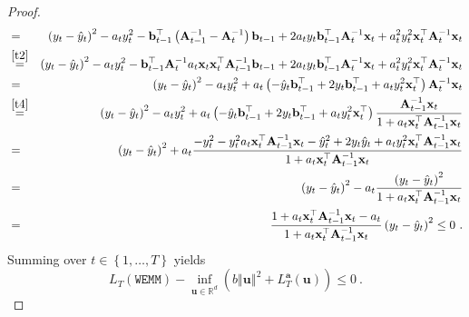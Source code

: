 \begin{proof}
\begin{eqnarray*}
 & = & \left(y_{t}-\hat{y}_{t}\right)^{2}-a_{t}y_{t}^{2}-\mathbf{b}_{t-1}^{\top}\left(\mathbf{A}_{t-1}^{-1}-\mathbf{A}_{t}^{-1}\right)\mathbf{b}_{t-1}+2a_{t}y_{t}\mathbf{b}_{t-1}^{\top}\mathbf{A}_{t}^{-1}\mathbf{x}_{t}+a_{t}^{2}y_{t}^{2}\mathbf{x}_{t}^{\top}\mathbf{A}_{t}^{-1}\mathbf{x}_{t}\\
 & \overset{\eqref{t2}}{=}  &\left(y_{t}-\hat{y}_{t}\right)^{2}-a_{t}y_{t}^{2}-\mathbf{b}_{t-1}^{\top}\mathbf{A}_{t}^{-1}a_{t}\mathbf{x}_{t}\mathbf{x}_{t}^{\top}\mathbf{A}_{t-1}^{-1}\mathbf{b}_{t-1}+2a_{t}y_{t}\mathbf{b}_{t-1}^{\top}\mathbf{A}_{t}^{-1}\mathbf{x}_{t}+a_{t}^{2}y_{t}^{2}\mathbf{x}_{t}^{\top}\mathbf{A}_{t}^{-1}\mathbf{x}_{t}\\
&=  & \left(y_{t}-\hat{y}_{t}\right)^{2}-a_{t}y_{t}^{2}+a_{t}\left(-\hat{y}_{t}\mathbf{b}_{t-1}^{\top}+2y_{t}\mathbf{b}_{t-1}^{\top}+a_{t}y_{t}^{2}\mathbf{x}_{t}^{\top}\right)\mathbf{A}_{t}^{-1}\mathbf{x}_{t}\\
 &\overset{\eqref{t4}}{=}  & \left(y_{t}-\hat{y}_{t}\right)^{2}-a_{t}y_{t}^{2}+a_{t}\left(-\hat{y}_{t}\mathbf{b}_{t-1}^{\top}+2y_{t}\mathbf{b}_{t-1}^{\top}+a_{t}y_{t}^{2}\mathbf{x}_{t}^{\top}\right)\frac{\mathbf{A}_{t-1}^{-1}\mathbf{x}_{t}}{1+a_{t}\mathbf{x}_{t}^{\top}\mathbf{A}_{t-1}^{-1}\mathbf{x}_{t}}\\
 & = & \left(y_{t}-\hat{y}_{t}\right)^{2}+a_{t}\frac{-y_{t}^{2}-y_{t}^{2}a_{t}\mathbf{x}_{t}^{\top}\mathbf{A}_{t-1}^{-1}\mathbf{x}_{t}-\hat{y}_{t}^{2}+2y_{t}\hat{y}_{t}+a_{t}y_{t}^{2}\mathbf{x}_{t}^{\top}\mathbf{A}_{t-1}^{-1}\mathbf{x}_{t}}{1+a_{t}\mathbf{x}_{t}^{\top}\mathbf{A}_{t-1}^{-1}\mathbf{x}_{t}}\\
 & = & \left(y_{t}-\hat{y}_{t}\right)^{2}-a_{t}\frac{\left(y_{t}-\hat{y}_{t}\right)^{2}}{1+a_{t}\mathbf{x}_{t}^{\top}\mathbf{A}_{t-1}^{-1}\mathbf{x}_{t}}\\
&
=&\frac{1+a_{t}\mathbf{x}_{t}^{\top}\mathbf{A}_{t-1}^{-1}\mathbf{x}_{t}-a_{t}}{1+a_{t}\mathbf{x}_{t}^{\top}\mathbf{A}_{t-1}^{-1}\mathbf{x}_{t}}\left(y_{t}-\hat{y}_{t}\right)^{2}
\leq0 ~.
\end{eqnarray*}
Summing over $t\in\left\{ 1,\ldots,T\right\} $
yields
\[
L_{T}(\texttt{WEMM})-\inf_{\mathbf{u}\in\mathbb{R}^{d}}\left(b\left\Vert
    \mathbf{u}\right\Vert
  ^{2}+L_{T}^{\boldsymbol{a}}(\mathbf{u})\right)\leq 0~.
\]
 \QED
\end{proof}

